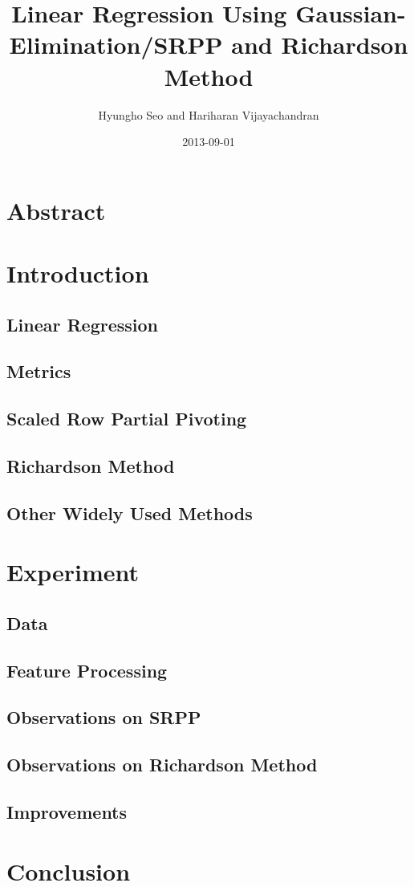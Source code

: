 \documentclass{article}
\title{Linear Regression Using Gaussian-Elimination/SRPP and Richardson Method}
\date{2013-09-01}
\author{Hyungho Seo and Hariharan Vijayachandran}
\begin{document}
\maketitle
{}
\newpage
{}

\section{Abstract}


\section{Introduction}
\subsection{Linear Regression}
\subsection{Metrics}
\subsection{Scaled Row Partial Pivoting}
\subsection{Richardson Method}
\subsection{Other Widely Used Methods}
\section{Experiment}
\subsection{Data}
\subsection{Feature Processing}
\subsection{Observations on SRPP}
\subsection{Observations on Richardson Method}
\subsection{Improvements}
\section{Conclusion}
\end{document}
